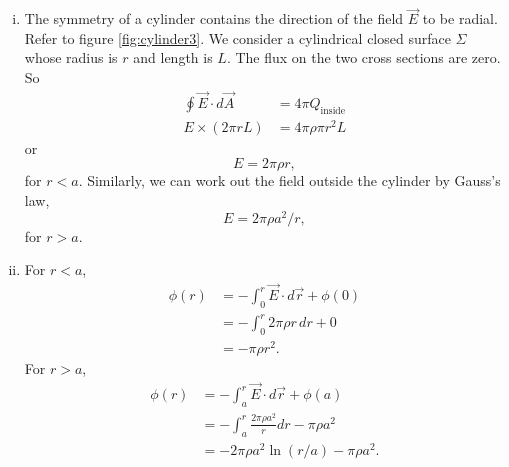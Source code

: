 \documentclass{esg8022pset}
\begin{document}
\begin{solution}
\begin{enumerate}[(a)]
    \begin{enumerate}[(i)]
      \item The symmetry of a cylinder contains the direction of the field
        $\vec{E}$ to be radial.  Refer to figure \ref{fig:cylinder3}.  We
        consider a cylindrical closed surface $\Sigma$ whose radius is $r$ and
        length is $L$.  The flux on the two cross sections are zero.  So
        \begin{align*}
          \oint \vec{E}\cdot d\vec{A} & = 4\pi Q_{\text{inside}}\\
          E\times(2\pi rL) & = 4\pi\rho\pi r^2L
        \end{align*}
        or
        \begin{equation*}
        E=2\pi\rho r,
        \end{equation*}
        for $r<a$.  Similarly, we can work out the field outside the cylinder
        by Gauss's law,
        \begin{equation*}
        E=2\pi\rho a^2/r,
        \end{equation*}
        for $r>a$.
      \item For $r<a$, 
        \begin{align*}
          \phi(r) & = -\int_0^r\vec{E}\cdot d\vec{r}+\phi(0)\\
                  & = -\int_0^r 2\pi\rho r\,dr+0\\
                  & = -\pi\rho r^2.
        \end{align*}
        For $r>a$,
        \begin{align*}
          \phi(r) & = -\int_a^r \vec{E}\cdot d\vec{r}+\phi(a)\\
                  & = -\int_a^r\frac{2\pi\rho a^2}{r}dr-\pi\rho a^2\\
                  & = -2\pi\rho a^2\ln{(r/a)}-\pi\rho a^2.
        \end{align*}
    \end{enumerate}
  \end{enumerate}
\end{solution}
\end{document}

